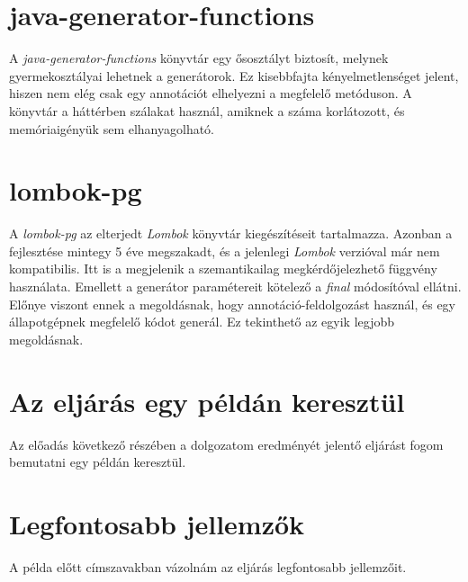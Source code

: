 \documentclass[12pt, a4paper]{article}
\begin{document}
\section{java-generator-functions}
A \textit{java-generator-functions} könyvtár egy ősosztályt biztosít, melynek gyermekosztályai lehetnek a generátorok. Ez kisebbfajta kényelmetlenséget jelent, hiszen nem elég csak egy annotációt elhelyezni a megfelelő metóduson. A könyvtár a háttérben szálakat használ, amiknek a száma korlátozott, és memóriaigényük sem elhanyagolható.

\section{lombok-pg}
A \textit{lombok-pg} az elterjedt \textit{Lombok} könyvtár kiegészítéseit tartalmazza. Azonban a fejlesztése mintegy 5 éve megszakadt, és a jelenlegi \textit{Lombok} verzióval már nem kompatibilis. Itt is a megjelenik a szemantikailag megkérdőjelezhető függvény használata. Emellett a generátor paramétereit kötelező a \textit{final} módosítóval ellátni. Előnye viszont ennek a megoldásnak, hogy annotáció-feldolgozást használ, és egy állapotgépnek megfelelő kódot generál. Ez tekinthető az egyik legjobb megoldásnak.

\section{Az eljárás egy példán keresztül}
Az előadás következő részében a dolgozatom eredményét jelentő eljárást fogom bemutatni egy példán keresztül.

\section{Legfontosabb jellemzők}

A példa előtt címszavakban vázolnám az eljárás legfontosabb jellemzőit.
\end{document}
